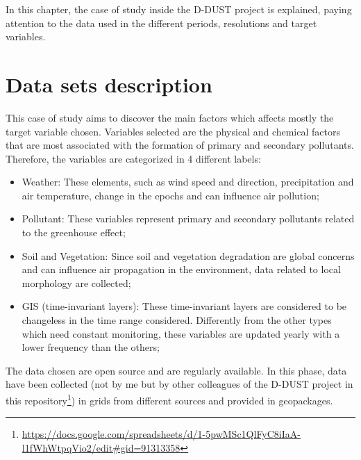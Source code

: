 In this chapter, the case of study inside the D-DUST project is explained, paying attention to the data used in the different periods, resolutions and target variables.
\section{Data sets description}
This case of study aims to discover the main factors which affects mostly the target variable chosen. 
Variables selected are the physical and chemical factors that are most associated with the formation of primary and secondary pollutants. \newline
Therefore, the variables are categorized in 4 different labels:
\begin{itemize}
\item Weather: These elements, such as wind speed and direction, precipitation and air temperature, change in the epochs and can influence air pollution;
\item Pollutant: These variables represent primary and secondary pollutants related to the greenhouse effect;
\item Soil and Vegetation: Since soil and vegetation degradation are global concerns and can influence air propagation in the environment, data related to local morphology are collected;
\item GIS (time-invariant layers): These time-invariant layers are considered to be changeless in the time range considered. Differently from the other types which need constant monitoring, these variables are updated yearly with a lower frequency than the others;
\end{itemize}
The data chosen are open source and are regularly available.
In this phase, data have been collected (not by me but by other colleagues of the D-DUST project in this repository\footnote{ \url{https://docs.google.com/spreadsheets/d/1-5pwMSc1QlFyC8iIaA-l1fWhWtpqVio2/edit\#gid=91313358}}) in grids from different sources and provided in geopackages. 
